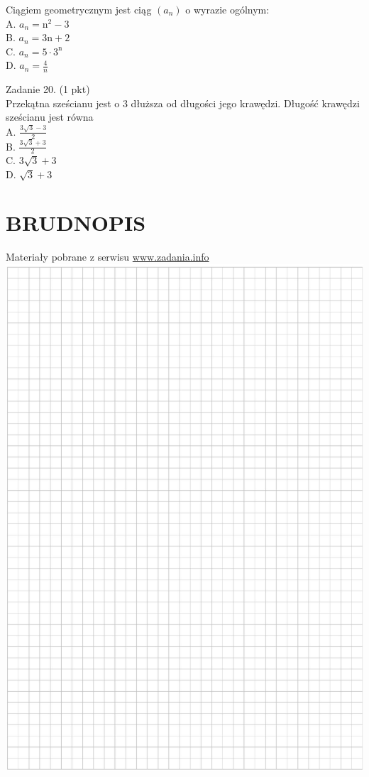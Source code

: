 \documentclass[10pt]{article}
\begin{document}
Ciągiem geometrycznym jest ciąg \(\left(a_{n}\right)\) o wyrazie ogólnym:\\
A. \(a_{n}=\mathrm{n}^{2}-3\)\\
B. \(a_{n}=3 \mathrm{n}+2\)\\
C. \(a_{n}=5 \cdot 3^{\mathrm{n}}\)\\
D. \(a_{n}=\frac{4}{n}\)

Zadanie 20. (1 pkt)\\
Przekątna sześcianu jest o 3 dłuższa od długości jego krawędzi. Długość krawędzi sześcianu jest równa\\
A. \(\frac{3 \sqrt{3}-3}{2}\)\\
B. \(\frac{3 \sqrt{3}+3}{2}\)\\
C. \(3 \sqrt{3}+3\)\\
D. \(\sqrt{3}+3\)

\section*{BRUDNOPIS}
Materiały pobrane z serwisu \href{http://www.zadania.info}{www.zadania.info}\\
\includegraphics[max width=\textwidth, center]{2024_11_21_b31e6de468170710de69g-07}
\end{document}
